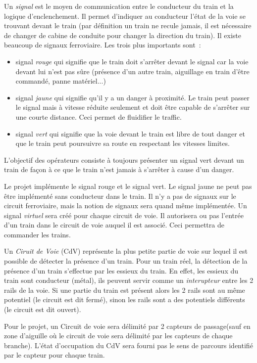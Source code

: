 Un \emph{signal} est le moyen de communication entre le conducteur du
train et la logique d'enclenchement.  Il permet d'indiquer au
conducteur l'état de la voie se trouvant devant le train (par
définition un train ne recule jamais, il est nécessaire de changer de
cabine de conduite pour changer la direction du train). Il existe
beaucoup de signaux ferroviaire. Les trois plus importants sont~:
\begin{itemize}
\item signal \emph{rouge} qui signifie que le train doit s'arrêter
  devant le signal car la voie devant lui n'est pas sûre (présence
  d'un autre train, aiguillage en train d'être commandé, panne
  matériel...)
\item signal \emph{jaune} qui signifie qu'il y a un danger à
  proximité. Le train peut passer le signal mais à vitesse réduite
  seulement et doit être capable de s'arrêter sur une courte
  distance. Ceci permet de fluidifier le traffic.
\item signal \emph{vert} qui signifie que la voie devant le train est
  libre de tout danger et que le train peut poursuivre sa route en
  respectant les vitesses limites.
\end{itemize}

L'objectif des opérateurs consiste à toujours présenter un signal vert
devant un train de façon à ce que le train n'est jamais à s'arrêter à
cause d'un danger.


\medskip
Le projet implémente le signal rouge et le signal vert. Le signal
jaune ne peut pas être implémenté sans conducteur dans le train. Il
n'y a pas de signaux sur le circuit ferroviaire, mais la notion de
signaux sera quand même implémentée. Un signal \emph{virtuel} sera
créé pour chaque circuit de voie. Il autorisera ou pas l'entrée d'un
train dans le circuit de voie auquel il est associé.  Ceci permettra
de commander les trains. 

\medskip
Un \emph{Ciruit de Voie} (CdV) représente la plus petite partie de
voie sur lequel il est possible de détecter la présence d'un
train. Pour un train réel, la détection de la présence d'un train
s'effectue par les essieux du train. En effet, les essieux du train
sont conducteur (métal), ils peuvent servir comme un
\emph{interupteur} entre les 2 rails de la voie. Si une partie du
train est présent alors les 2 rails sont au même potentiel (le circuit
est dit fermé), sinon les rails sont a des potentiels différents (le
circuit est dit ouvert).

\medskip
Pour le projet, un Circuit de voie sera délimité par 2 capteurs de
passage(sauf en zone d'aiguille où le circuit de voie sera délimité
par les capteurs de chaque branche). L'état d'occupation du CdV sera
fourni pas le sens de parcours identifié par le capteur pour chaque
train.


